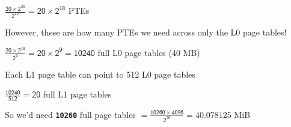   \begin{slide}
    

    $\mathsf{\frac{20 \times 2^{30}}{2^{12}} = 20 \times 2^{18}}$ PTEs
    \medskip

    However, these are how many PTEs we need across only the L0 page tables!
    \medskip

    $\mathsf{\frac{20 \times 2^{18}}{2^{9}} = 20 \times 2^{9} = 10240}$ full L0
    page tables (40 MB)
    \medskip

    Each L1 page table can point to 512 L0 page tables
    \medskip

    $\mathsf{\frac{10240}{512} = 20}$ full L1 page tables
    \medskip

    So we'd need \texttt{\bfseries 10260} full page tables
    $\mathsf{= \frac{10260 \times 4096}{2^{20}} = 40.078125}$ MiB

  \end{slide}


